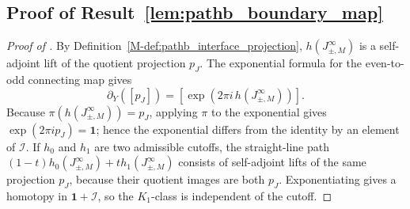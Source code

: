 \documentclass[11pt]{article}
\numberwithin{equation}{section}
\theoremstyle{definition}
\theoremstyle{remark}
\newcommand{\Id}{\mathbf{1}}
\begin{document}
\subsection{Proof of Result~\ref{lem:pathb_boundary_map}}\label{app:proof:lem:pathb_boundary_map}
\begin{proof}[Proof of ]
By Definition~\ref{M-def:pathb_interface_projection}, \(h(J_{\pm,M}^\infty)\) is a self-adjoint lift
of the quotient projection \(p_J\). The exponential formula for the even-to-odd connecting map gives
\[
\partial_Y([p_J])
=
\left[\exp(2\pi i\,h(J_{\pm,M}^\infty))\right].
\]
Because \(\pi(h(J_{\pm,M}^\infty))=p_J\), applying \(\pi\) to the exponential gives
\(\exp(2\pi i p_J)=\Id\); hence the exponential differs from the identity by an element of
\(\mathcal I\). If \(h_0\) and \(h_1\) are two admissible cutoffs, the straight-line path
\((1-t)h_0(J_{\pm,M}^\infty)+t h_1(J_{\pm,M}^\infty)\) consists of self-adjoint lifts of the same
projection \(p_J\), because their quotient images are both \(p_J\). Exponentiating gives a homotopy
in \(\Id+\mathcal I\), so the \(K_1\)-class is independent of the cutoff.
\end{proof}
\end{document}
